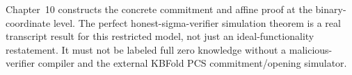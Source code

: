 \begin{remark}
Chapter~10 constructs the concrete
commitment and affine proof at the
binary-coordinate level. The
perfect honest-sigma-verifier
simulation theorem is a real
transcript result for this
restricted model, not just an
ideal-functionality restatement.
It must not be labeled full
zero knowledge without a
malicious-verifier compiler
and the external KBFold PCS
commitment/opening simulator.
\end{remark}
